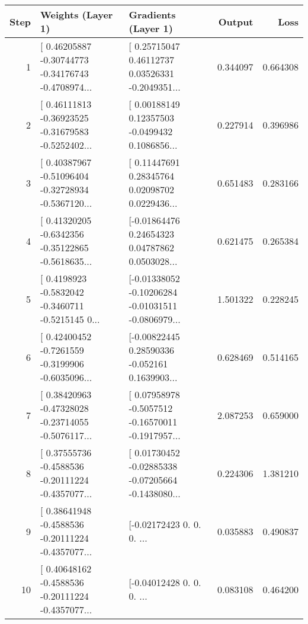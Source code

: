 \begin{tabular}{rllrr}
\toprule
 Step &                                  Weights (Layer 1) &                                Gradients (Layer 1) &   Output &     Loss \\
\midrule
    1 & [ 0.46205887 -0.30744773 -0.34176743 -0.4708974... & [ 0.25715047  0.46112737  0.03526331 -0.2049351... & 0.344097 & 0.664308 \\
    2 & [ 0.46111813 -0.36923525 -0.31679583 -0.5252402... & [ 0.00188149  0.12357503 -0.0499432   0.1086856... & 0.227914 & 0.396986 \\
    3 & [ 0.40387967 -0.51096404 -0.32728934 -0.5367120... & [ 0.11447691  0.28345764  0.02098702  0.0229436... & 0.651483 & 0.283166 \\
    4 & [ 0.41320205 -0.6342356  -0.35122865 -0.5618635... & [-0.01864476  0.24654323  0.04787862  0.0503028... & 0.621475 & 0.265384 \\
    5 & [ 0.4198923 -0.5832042 -0.3460711 -0.5215145  0... & [-0.01338052 -0.10206284 -0.01031511 -0.0806979... & 1.501322 & 0.228245 \\
    6 & [ 0.42400452 -0.7261559  -0.3199906  -0.6035096... & [-0.00822445  0.28590336 -0.052161    0.1639903... & 0.628469 & 0.514165 \\
    7 & [ 0.38420963 -0.47328028 -0.23714055 -0.5076117... & [ 0.07958978 -0.5057512  -0.16570011 -0.1917957... & 2.087253 & 0.659000 \\
    8 & [ 0.37555736 -0.4588536  -0.20111224 -0.4357077... & [ 0.01730452 -0.02885338 -0.07205664 -0.1438080... & 0.224306 & 1.381210 \\
    9 & [ 0.38641948 -0.4588536  -0.20111224 -0.4357077... & [-0.02172423  0.          0.          0.       ... & 0.035883 & 0.490837 \\
   10 & [ 0.40648162 -0.4588536  -0.20111224 -0.4357077... & [-0.04012428  0.          0.          0.       ... & 0.083108 & 0.464200 \\
\bottomrule
\end{tabular}
